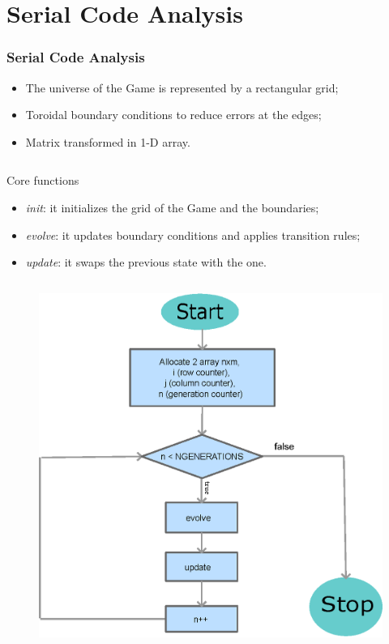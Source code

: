 \documentclass{beamer}
\begin{document}
\section{Serial Code Analysis}
\begin{frame}
	\frametitle{Serial Code Analysis}
	\begin{minipage}{0.6\textwidth}
		\begin{itemize}
			\item The universe of the Game is represented by a rectangular grid;
			\item Toroidal boundary conditions to reduce errors at the edges;
			\item Matrix transformed in 1-D array.
		\end{itemize}
		\begin{columns}
			\begin{block}{Core functions}
				\begin{itemize}
					\item \textit{init}: it initializes the grid of the Game and the boundaries;\\
					\item \textit{evolve}: it updates boundary conditions and applies transition rules;\\
					\item \textit{update}: it swaps the previous state with the one.
				\end{itemize}
			\end{block}
		\end{columns}
	\end{minipage}%
	\begin{minipage}{0.4\textwidth}
		\begin{figure}
			\centering
			\includegraphics[width=\linewidth]{../report/chart.eps}
		\end{figure}
	\end{minipage}
\end{frame}
\end{document}
